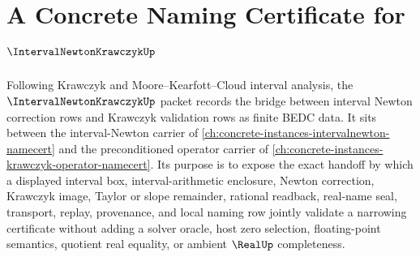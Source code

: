 \chapter{A Concrete Naming Certificate for $\IntervalNewtonKrawczykUp$}
\label{ch:concrete-instances-interval-newton-krawczyk-namecert}

Following Krawczyk and Moore--Kearfott--Cloud interval analysis, the $\IntervalNewtonKrawczykUp$ packet records the bridge between interval Newton correction rows and Krawczyk validation rows as finite BEDC data. It sits between the interval-Newton carrier of \autoref{ch:concrete-instances-intervalnewton-namecert} and the preconditioned operator carrier of \autoref{ch:concrete-instances-krawczyk-operator-namecert}. Its purpose is to expose the exact handoff by which a displayed interval box, interval-arithmetic enclosure, Newton correction, Krawczyk image, Taylor or slope remainder, rational readback, real-name seal, transport, replay, provenance, and local naming row jointly validate a narrowing certificate without adding a solver oracle, host zero selection, floating-point semantics, quotient real equality, or ambient $\RealUp$ completeness.

